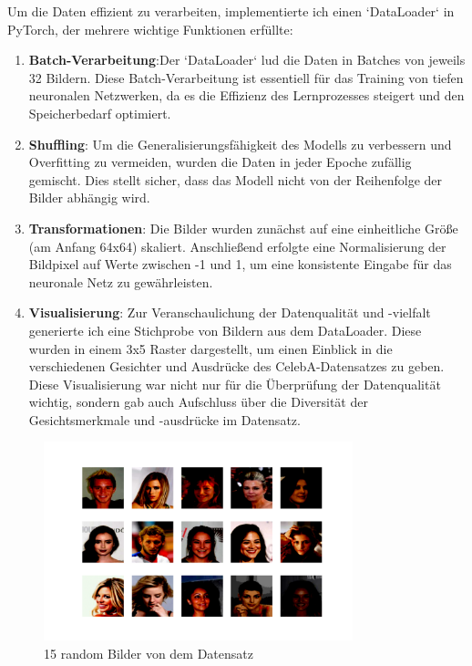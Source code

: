 \documentclass[a4paper, 12pt]{article}
\begin{document}
Um die Daten effizient zu verarbeiten, implementierte ich einen `DataLoader` in PyTorch, der mehrere wichtige Funktionen erfüllte:


\begin{enumerate}
 \item \textbf{Batch-Verarbeitung}:Der `DataLoader` lud die Daten in Batches von jeweils 32 Bildern. Diese Batch-Verarbeitung ist essentiell für das Training von tiefen neuronalen Netzwerken, da es die Effizienz des Lernprozesses steigert und den Speicherbedarf optimiert.

 \item \textbf{Shuffling}: Um die Generalisierungsfähigkeit des Modells zu verbessern und Overfitting zu vermeiden, wurden die Daten in jeder Epoche zufällig gemischt. Dies stellt sicher, dass das Modell nicht von der Reihenfolge der Bilder abhängig wird.

 \item \textbf{Transformationen}: Die Bilder wurden zunächst auf eine einheitliche Größe (am Anfang 64x64) skaliert. Anschließend erfolgte eine Normalisierung der Bildpixel auf Werte zwischen -1 und 1, um eine konsistente Eingabe für das neuronale Netz zu gewährleisten.

 \item \textbf{Visualisierung}: Zur Veranschaulichung der Datenqualität und -vielfalt generierte ich eine Stichprobe von Bildern aus dem DataLoader. Diese wurden in einem 3x5 Raster dargestellt, um einen Einblick in die verschiedenen Gesichter und Ausdrücke des CelebA-Datensatzes zu geben. Diese Visualisierung war nicht nur für die Überprüfung der Datenqualität wichtig, sondern gab auch Aufschluss über die Diversität der Gesichtsmerkmale und -ausdrücke im Datensatz.
\end{enumerate}

\begin{figure}[ht]
\centering
\includegraphics[width=0.8\textwidth]{./img/data_faces.png}
\caption{15 random Bilder von dem Datensatz}
\label{fig:random_faces}
\end{figure}
\end{document}
